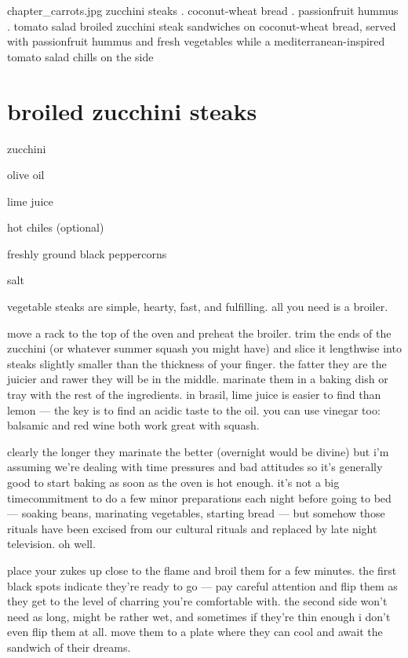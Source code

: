 \mychapter
{chapter_carrots.jpg}
{zucchini steaks . coconut-wheat bread . passionfruit hummus . tomato
salad} {broiled zucchini steak sandwiches on coconut-wheat bread,
served with passionfruit hummus and fresh vegetables while a
mediterranean-inspired tomato salad chills on the side}

\section{broiled zucchini steaks}

\begin{ingredients}
  \item zucchini
  \item olive oil
  \item lime juice
  \item hot chiles (optional)
  \item freshly ground black peppercorns
  \item salt
\end{ingredients}

vegetable steaks are simple, hearty, fast, and fulfilling. all you
need is a broiler.

move a rack to the top of the oven and preheat the broiler. trim the
ends of the zucchini (or whatever summer squash you might have) and
slice it lengthwise into steaks slightly smaller than the thickness of
your finger. the fatter they are the juicier and rawer they will be in
the middle. marinate them in a baking dish or tray with the rest of
the ingredients. in brasil, lime juice is easier to find than lemon
--- the key is to find an acidic taste to  the oil. you can use
vinegar too: balsamic and red wine both work great with squash.

clearly the longer they marinate the better (overnight would be
divine) but i'm assuming we're dealing with time pressures and bad
attitudes so it's generally good to start baking as soon as the oven
is hot enough. it's not a big timecommitment to do a few minor
preparations each night before going to bed --- soaking beans,
marinating vegetables, starting bread --- but somehow those rituals
have been excised from our cultural rituals and replaced by late night
television. oh well.

place your zukes up close to the flame and broil them for a few
minutes. the first black spots indicate they're ready to go --- pay
careful attention and flip them as they get to the level of charring
you're comfortable with. the second side won't need as long, might be
rather wet, and sometimes if they're thin enough i don't even flip
them at all. move them to a plate where they can cool and await the
sandwich of their dreams.

